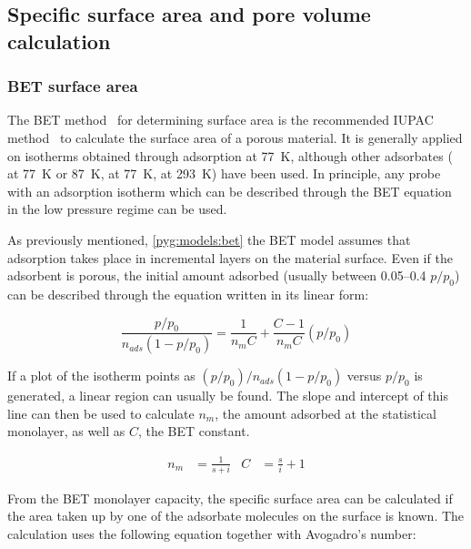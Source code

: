 
\subsection{Specific surface area and pore volume calculation}

\subsubsection{BET surface area}\label{pyg:charac:betarea}

The BET method~\cite{brunauerAdsorptionGasesMultimolecular1938}
for determining surface area is the recommended IUPAC
method~\cite{thommesPhysisorptionGasesSpecial2015}
to calculate the surface area of a porous material.
It is generally applied on isotherms obtained through 
adsorption at \SI{77}{\kelvin}, although other adsorbates
( at \SI{77}{\kelvin} or \SI{87}{\kelvin},
 at \SI{77}{\kelvin},  at \SI{293}{\kelvin})
have been used. In principle, any probe with an adsorption isotherm
which can be described through the BET equation in the low pressure regime
can be used.

As previously mentioned, \autoref{pyg:models:bet} the BET model assumes
that adsorption takes place in incremental layers on the material
surface. Even if the adsorbent is porous, the initial amount adsorbed
(usually between 0.05--0.4 \(p/p_0\)) can be
described through the equation written in its linear form:

\begin{equation}
	\frac{p/p_0}{n_{ads} (1-p/p_0)} = \frac{1}{n_{m} C} + \frac{C - 1}{n_{m} C}(p/p_0)
\end{equation}

If a plot of the isotherm points as \({(p/p_0)}/{n_{ads}(1-p/p_0)}\)
versus \(p/p_0\) is generated, a linear region
can usually be found. The slope and intercept of this line
can then be used to calculate \(n_{m}\), the amount adsorbed at the
statistical monolayer, as well as \(C\), the BET constant.

\begin{align}
	n_{m} & = \frac{1}{s+i} & C & = \frac{s}{i} + 1
\end{align}

From the BET monolayer capacity, the specific surface area can be
calculated if the area taken up by one of the adsorbate molecules
on the surface is known. The calculation uses the following equation
together with Avogadro's number:

